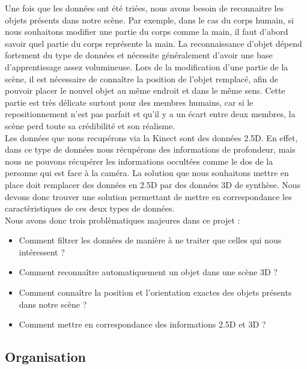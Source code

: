 Une fois que les données ont été triées, nous avons besoin de reconnaitre les objets présents dans notre scène. Par exemple, dans
le cas du corps humain, si nous souhaitons modifier une partie du corps comme la main, il faut d'abord savoir quel partie du corps représente 
la main. La reconnaissance d'objet dépend fortement du type de données et nécessite généralement d'avoir une base d'apprentissage 
assez volumineuse. Lors de la modification d'une partie de la scène, il est nécessaire de connaître la position de l'objet remplacé, afin de pouvoir
placer le nouvel objet au même endroit et dans le même sens. Cette partie est très délicate surtout pour des membres humains, car
si le repositionnement n'est pas parfait et qu'il y a un écart entre deux membres, la scène perd toute sa crédibilité et son 
réalisme.\\

Les données que nous recupérons via la Kinect sont des données 2.5D. En effet, dans ce type de données nous récupérons des 
informations de profondeur, mais nous ne pouvons récupérer les informations occultées comme le dos de la personne qui est face à la caméra.
La solution que nous souhaitons mettre en place doit remplacer des données en 2.5D par des données 3D de synthèse. Nous devons donc
trouver une solution permettant de mettre en correspondance les caractèristiques de ces deux types de données.\\

Nous avons donc trois problèmatiques majeures dans ce projet : 
\begin{itemize}
  \item Comment filtrer les données de manière à ne traiter que celles qui nous intéressent ?
  \item Comment reconnaître automatiquement un objet dans une scène 3D ?
  \item Comment connaître la position et l'orientation exactes des objets présents dans notre scène ?
  \item Comment mettre en correspondance des informations 2.5D et 3D ?
\end{itemize}

\subsection{Organisation}

